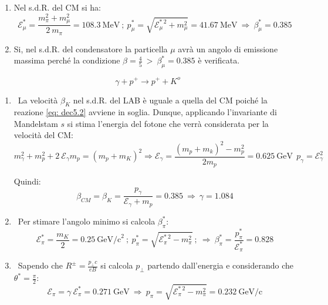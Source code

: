 \documentclass[12pt,twoside,a4]{article}
\begin{document}
\begin{solution}
\begin{enumerate}[label=(\textit{\roman*})]
\item Nel s.d.R. del CM si ha: \begin{equation*}
    \mathcal{E}^\ast_\mu = \frac{m^2_\pi + m^2_\mu}{2 \ m_\pi} = 108.3 \ \mathrm{MeV} \ ;  \  p^\ast_\mu = \sqrt{\mathcal{E}^{\ast \ 2}_\mu + m^2_\mu} = 41.67 \ \mathrm{MeV}  \  \Rightarrow  \  \beta^\ast_\mu = 0.385  
\end{equation*}

\item Si, nel s.d.R. del condensatore la particella $\mu$ avrà un angolo di emissione massima perché la condizione $\beta = \frac{4}{5} \ > \ \beta^\ast_\mu = 0.385$ è verificata.
\end{enumerate}
\end{solution}

\newpage
\begin{solution}
\begin{equation}
    \label{eq: dec5.2}
    \gamma + p^+ \rightarrow p^+ + K^o
\end{equation}
\begin{enumerate}[label=(\textit{\roman*})]
\item \ La velocità $\beta_K$ nel s.d.R. del LAB è uguale a quella del CM poiché la reazione \ref{eq: dec5.2} avviene in soglia. Dunque, applicando l'invariante di Mandelstam $s$ si stima l'energia del fotone che verrà considerata per la velocità del CM: \begin{equation*}
 m^2_\gamma + m^2_p + 2 \ \mathcal{E}_\gamma m_p = (m_p + m_K)^2 \Rightarrow \boxed{ \mathcal{E}_\gamma = \frac{(m_p + m_k)^2 - m^2_p}{2 m_p} = 0.625 \ \mathrm{GeV} } \  \ p_\gamma = \mathcal{E}^2_\gamma 
\end{equation*}

Quindi: \begin{equation*}
\beta_{CM} = \beta_K = \frac{p_\gamma }{\mathcal{E}_\gamma + m_p} = 0.385  \  \Rightarrow  \  \gamma = 1.084   
\end{equation*}

\bigskip
\item \ Per stimare l'angolo minimo si calcola $\beta^\ast_\pi$: \begin{equation*}
 \mathcal{E}^\ast_\pi = \frac{m_K}{2} = 0.25 \ \mathrm{GeV/c}^2 \ ;  \  p^\ast_\pi = \sqrt{\mathcal{E}^{\ast \ 2}_\pi - m^2_\pi} \ ;  \  \Rightarrow  \  \beta^\ast_\pi = \frac{p^\ast_\pi}{\mathcal{E}^\ast_\pi} = 0.828  
\end{equation*}

\bigskip
\item \ Sapendo che $R^{\pm} = \frac{p_\bot c}{e B}$ si calcola $p_\bot$ partendo dall'energia e considerando che $\theta^\ast = \frac{\pi}{2}$: \begin{equation*}
   \mathcal{E}_\pi = \gamma \ \mathcal{E}^\ast_\pi = 0.271 \ \mathrm{GeV}  \  \Rightarrow  \  p_\pi = \sqrt{\mathcal{E}^{\ast \ 2}_\pi - m^2_\pi} = 0.232 \ \mathrm{GeV/c} 
\end{equation*}


\end{enumerate}
\end{solution}
\end{document}
